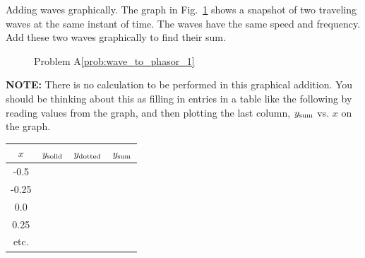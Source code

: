 \begin{aproblem}{Adding waves graphically.}
  The graph in Fig.~\ref{fig:wave_to_phasor_1} shows a snapshot of two
  traveling waves at the same instant of time.  The waves have the
  same speed and frequency.  Add these two waves graphically to find
  their sum.

  \label{prob:wave_to_phasor_1}
  \begin{figure}[h]
    \begin{center}
      \caption{Problem A\ref{prob:wave_to_phasor_1}}
      \label{fig:wave_to_phasor_1}
    \end{center}
  \end{figure}

  \vspace{-0.1in}
  {\bf NOTE:} There is no calculation to be performed in this
  graphical addition.  You should be thinking about this as filling in
  entries in a table like the following by reading values from the
  graph, and then plotting the last column, $y_{\rm sum}$ vs. $x$ on
  the graph.

  \begin{center}
    \begin{tabular}{|c||c|c||c|} \hline
      $x$ & $y_{\rm solid}$ & $y_{\rm dotted}$ & $y_{\rm sum}$ \\ \hline\hline  
      -0.5  & & & \\ \hline
      -0.25 & & & \\ \hline
      0.0   & & & \\ \hline
      0.25  & & & \\ \hline
      \mbox{etc.} & & & \\ \hline
    \end{tabular}
  \end{center}
  \vspace{0.1in}
\end{aproblem}

